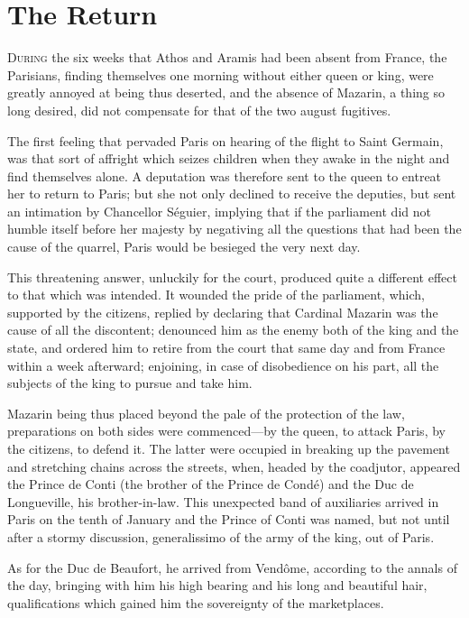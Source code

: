 \chapter{The Return}

 \lettrine{D}{uring} the six weeks that Athos and Aramis had been absent from France, the Parisians, finding themselves one morning without either queen or king, were greatly annoyed at being thus deserted, and the absence of Mazarin, a thing so long desired, did not compensate for that of the two august fugitives.

The first feeling that pervaded Paris on hearing of the flight to Saint Germain, was that sort of affright which seizes children when they awake in the night and find themselves alone. A deputation was therefore sent to the queen to entreat her to return to Paris; but she not only declined to receive the deputies, but sent an intimation by Chancellor Séguier, implying that if the parliament did not humble itself before her majesty by negativing all the questions that had been the cause of the quarrel, Paris would be besieged the very next day.

This threatening answer, unluckily for the court, produced quite a different effect to that which was intended. It wounded the pride of the parliament, which, supported by the citizens, replied by declaring that Cardinal Mazarin was the cause of all the discontent; denounced him as the enemy both of the king and the state, and ordered him to retire from the court that same day and from France within a week afterward; enjoining, in case of disobedience on his part, all the subjects of the king to pursue and take him.

Mazarin being thus placed beyond the pale of the protection of the law, preparations on both sides were commenced—by the queen, to attack Paris, by the citizens, to defend it. The latter were occupied in breaking up the pavement and stretching chains across the streets, when, headed by the coadjutor, appeared the Prince de Conti (the brother of the Prince de Condé) and the Duc de Longueville, his brother-in-law. This unexpected band of auxiliaries arrived in Paris on the tenth of January and the Prince of Conti was named, but not until after a stormy discussion, generalissimo of the army of the king, out of Paris.

As for the Duc de Beaufort, he arrived from Vendôme, according to the annals of the day, bringing with him his high bearing and his long and beautiful hair, qualifications which gained him the sovereignty of the marketplaces.


